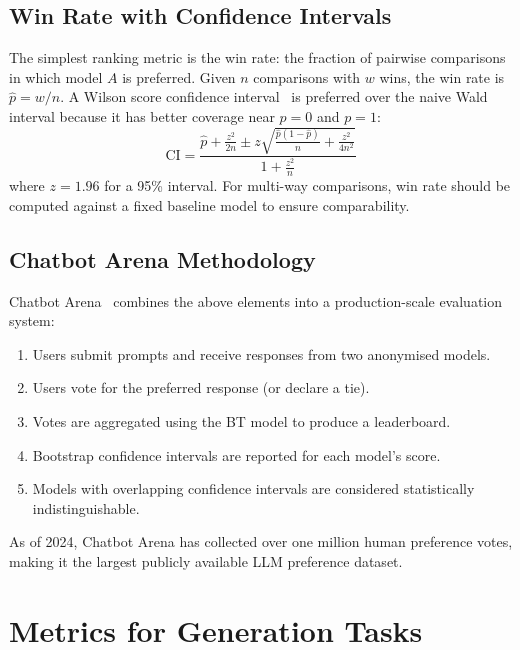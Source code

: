 \subsection{Win Rate with Confidence Intervals}
\label{win-rate-with-confidence-intervals}

The simplest ranking metric is the win rate: the fraction of pairwise comparisons in which model $A$ is preferred. Given $n$ comparisons with $w$ wins, the win rate is $\hat{p} = w/n$. A Wilson score confidence interval~\cite{wilson1927probable} is preferred over the naive Wald interval because it has better coverage near $p = 0$ and $p = 1$: 
\begin{equation}
    \text{CI} = \frac{\hat{p} + \frac{z^2}{2n} \pm z\sqrt{\frac{\hat{p}(1-\hat{p})}{n} + \frac{z^2}{4n^2}}}{1 + \frac{z^2}{n}}
\end{equation}
 where $z = 1.96$ for a 95\% interval. For multi-way comparisons, win rate should be computed against a fixed baseline model to ensure comparability.

\subsection{Chatbot Arena Methodology}
\label{chatbot-arena-methodology}

Chatbot Arena~\cite{zheng2023judging} combines the above elements into a production-scale evaluation system:

\begin{enumerate}
  \item Users submit prompts and receive responses from two anonymised models.
  \item Users vote for the preferred response (or declare a tie).
  \item Votes are aggregated using the BT model to produce a leaderboard.
  \item Bootstrap confidence intervals are reported for each model’s score.
  \item Models with overlapping confidence intervals are considered statistically indistinguishable.
\end{enumerate}

As of 2024, Chatbot Arena has collected over one million human preference votes, making it the largest publicly available LLM preference dataset.

\section{Metrics for Generation Tasks}
\label{subsec:generation-metrics}

